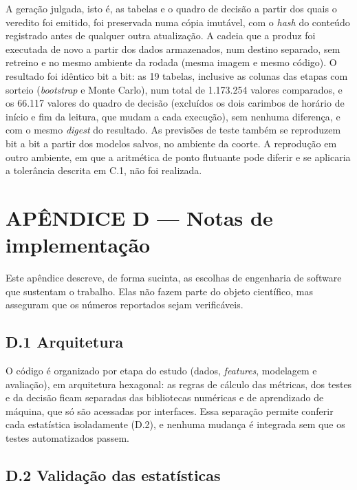 A geração julgada, isto é, as tabelas e o quadro de decisão a partir dos quais o veredito foi emitido, foi preservada numa cópia imutável, com o \textit{hash} do conteúdo registrado antes de qualquer outra atualização. A cadeia que a produz foi executada de novo a partir dos dados armazenados, num destino separado, sem retreino e no mesmo ambiente da rodada (mesma imagem e mesmo código). O resultado foi idêntico bit a bit: as 19 tabelas, inclusive as colunas das etapas com sorteio (\textit{bootstrap} e Monte Carlo), num total de 1.173.254 valores comparados, e os 66.117 valores do quadro de decisão (excluídos os dois carimbos de horário de início e fim da leitura, que mudam a cada execução), sem nenhuma diferença, e com o mesmo \textit{digest} do resultado. As previsões de teste também se reproduzem bit a bit a partir dos modelos salvos, no ambiente da coorte. A reprodução em outro ambiente, em que a aritmética de ponto flutuante pode diferir e se aplicaria a tolerância descrita em C.1, não foi realizada.

\chapter*{APÊNDICE D --- Notas de implementação}

Este apêndice descreve, de forma sucinta, as escolhas de engenharia de software que sustentam o trabalho. Elas não fazem parte do objeto científico, mas asseguram que os números reportados sejam verificáveis.

\section*{D.1 Arquitetura}

O código é organizado por etapa do estudo (dados, \textit{features}, modelagem e avaliação), em arquitetura hexagonal: as regras de cálculo das métricas, dos testes e da decisão ficam separadas das bibliotecas numéricas e de aprendizado de máquina, que só são acessadas por interfaces. Essa separação permite conferir cada estatística isoladamente (D.2), e nenhuma mudança é integrada sem que os testes automatizados passem.

\section*{D.2 Validação das estatísticas}

